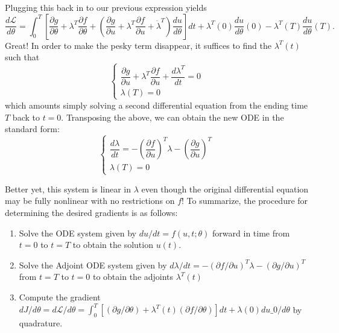 Plugging this back in to our previous expression yields
\begin{equation}
  \frac{d\mathcal{L}}{d\theta} = \int_0^T\left[\frac{\partial g}{\partial \theta} + \lambda^T\frac{\partial f}{\partial \theta} + \left(\frac{\partial g}{\partial u} + \lambda^T\frac{\partial f}{\partial u} + \dot{\lambda}^T \right)\frac{du}{d\theta} \right]dt + \lambda^T(0)\frac{du}{d\theta}(0) - \lambda^T(T)\frac{du}{d\theta}(T).
\end{equation}
Great! In order to make the pesky term disappear, it suffices to find the $\lambda^T(t)$ such that
\begin{equation}
  \begin{cases}
    \dfrac{\partial g}{\partial u} + \lambda^T\dfrac{\partial f}{\partial u} + \dfrac{d\lambda^T}{dt} = 0 \\
    \lambda(T) = 0
  \end{cases}
\end{equation}
which amounts simply solving a second differential equation from the ending time $T$ back to $t=0$. Transposing the above, we can obtain the new ODE in the standard form:
\begin{equation}
  \boxed{\begin{cases}
      \dfrac{d\lambda}{dt} = -\left(\dfrac{\partial f}{\partial u} \right)^T\lambda - \left(\dfrac{\partial g}{\partial u} \right)^T \\
      \lambda(T) = 0
  \end{cases}}
\end{equation}

Better yet, this system is linear in $\lambda$ even though the original differential equation may be fully nonlinear with no restrictions on $f$! To summarize, the procedure for determining the desired gradients is as follows:
\begin{enumerate}
\item Solve the ODE system given by $du/dt=f(u,t;\theta)$ forward in time from $t=0$ to $t=T$ to obtain the solution $u(t)$.
\item Solve the Adjoint ODE system given by $d\lambda/dt = -(\partial f/\partial u)^T\lambda - (\partial g/ \partial u)^T$ from $t=T$ to $t=0$ to obtain the adjoints $\lambda^T(t)$
\item Compute the gradient $dJ/d\theta = d\mathcal{L}/d\theta = \int_0^T[(\partial g/\partial \theta) + \lambda^T(t)(\partial{f}/\partial\theta)] dt + \lambda(0)du\_0/d\theta$ by quadrature.
\end{enumerate}



